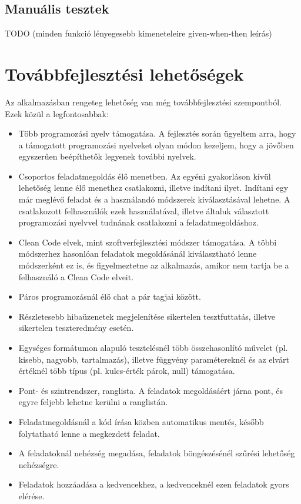 \documentclass{elteikthesis}
\begin{document}
			\subsection{Manuális tesztek}
			TODO (minden funkció lényegesebb kimeneteleire given-when-then leírás)
		
		\section{Továbbfejlesztési lehetőségek}
			Az alkalmazásban rengeteg lehetőség van még továbbfejlesztési szempontból. Ezek közül a legfontosabbak:
			\begin{itemize}
				\setlength\itemsep{-0.5em}
				\item Több programozási nyelv támogatása. A fejlesztés során ügyeltem arra, hogy a támogatott programozási nyelveket olyan módon kezeljem, hogy a jövőben egyszerűen beépíthetők legyenek további nyelvek.
				\item Csoportos feladatmegoldás élő menetben. Az egyéni gyakorláson kívül lehetőség lenne élő menethez csatlakozni, illetve indítani ilyet. Indítani egy már meglévő feladat és a használandó módszerek kiválasztásával lehetne. A csatlakozott felhasználók ezek használatával, illetve általuk választott programozási nyelvvel tudnának csatlakozni a feladatmegoldáshoz.
				\item Clean Code elvek, mint szoftverfejlesztési módszer támogatása. A többi módszerhez hasonlóan feladatok megoldásánál kiválasztható lenne módszerként ez is, és figyelmeztetne az alkalmazás, amikor nem tartja be a felhasználó a Clean Code elveit.
				\item Páros programozásnál élő chat a pár tagjai között.
				\item Részletesebb hibaüzenetek megjelenítése sikertelen tesztfuttatás, illetve sikertelen teszteredmény esetén.
				\item Egységes formátumon alapuló tesztelésnél több összehasonlító művelet (pl. kisebb, nagyobb, tartalmazás), illetve függvény paramétereknél és az elvárt értéknél több típus (pl. kulcs-érték párok, null) támogatása.
				\item Pont- és szintrendszer, ranglista. A feladatok megoldásáért járna pont, és egyre feljebb lehetne kerülni a ranglistán.
				\item Feladatmegoldásnál a kód írása közben automatikus mentés, később folytatható lenne a megkezdett feladat.
				\item A feladatoknál nehézség megadása, feladatok böngészésénél szűrési lehetőség nehézségre.
				\item Feladatok hozzáadása a kedvencekhez, a kedvenceknél ezen feladatok gyors elérése.
			\end{itemize}
\end{document}
